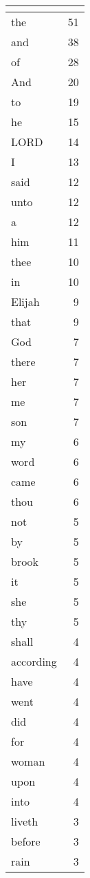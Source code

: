 \begin{center}
\begin{longtable}{l|r}
\hline \multicolumn{2}{c}{{ }} \\ \hline
\endfoot 
the & 51\\ \hline 
and & 38\\ \hline 
of & 28\\ \hline 
And & 20\\ \hline 
to & 19\\ \hline 
he & 15\\ \hline 
LORD & 14\\ \hline 
I & 13\\ \hline 
said & 12\\ \hline 
unto & 12\\ \hline 
a & 12\\ \hline 
him & 11\\ \hline 
thee & 10\\ \hline 
in & 10\\ \hline 
Elijah & 9\\ \hline 
that & 9\\ \hline 
God & 7\\ \hline 
there & 7\\ \hline 
her & 7\\ \hline 
me & 7\\ \hline 
son & 7\\ \hline 
my & 6\\ \hline 
word & 6\\ \hline 
came & 6\\ \hline 
thou & 6\\ \hline 
not & 5\\ \hline 
by & 5\\ \hline 
brook & 5\\ \hline 
it & 5\\ \hline 
she & 5\\ \hline 
thy & 5\\ \hline 
shall & 4\\ \hline 
according & 4\\ \hline 
have & 4\\ \hline 
went & 4\\ \hline 
did & 4\\ \hline 
for & 4\\ \hline 
woman & 4\\ \hline 
upon & 4\\ \hline 
into & 4\\ \hline 
liveth & 3\\ \hline 
before & 3\\ \hline 
rain & 3\\ \hline 

\end{longtable}
\end{center}
